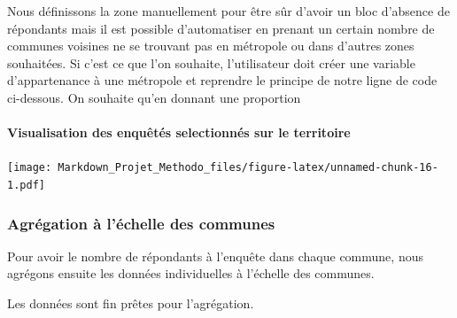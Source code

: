 \documentclass[
]{article}
\newenvironment{Shaded}{\begin{snugshade}}{\end{snugshade}}
\newcommand{\CommentTok}[1]{\textcolor[rgb]{0.56,0.35,0.01}{\textit{#1}}}
\newcommand{\DecValTok}[1]{\textcolor[rgb]{0.00,0.00,0.81}{#1}}
\newcommand{\FunctionTok}[1]{\textcolor[rgb]{0.00,0.00,0.00}{#1}}
\newcommand{\NormalTok}[1]{#1}
\newcommand{\OtherTok}[1]{\textcolor[rgb]{0.56,0.35,0.01}{#1}}
\newcommand{\SpecialCharTok}[1]{\textcolor[rgb]{0.00,0.00,0.00}{#1}}
\begin{document}
Nous définissons la zone manuellement pour être sûr d'avoir un bloc
d'absence de répondants mais il est possible d'automatiser en prenant un
certain nombre de communes voisines ne se trouvant pas en métropole ou
dans d'autres zones souhaitées. Si c'est ce que l'on souhaite,
l'utilisateur doit créer une variable d'appartenance à une métropole et
reprendre le principe de notre ligne de code ci-dessous. On souhaite
qu'en donnant une proportion

\begin{Shaded}
\end{Shaded}

\hypertarget{visualisation-des-enquuxeatuxe9s-selectionnuxe9s-sur-le-territoire}{%
\paragraph{Visualisation des enquêtés selectionnés sur le
territoire}\label{visualisation-des-enquuxeatuxe9s-selectionnuxe9s-sur-le-territoire}}

\texttt{[image: Markdown\_Projet\_Methodo\_files/figure-latex/unnamed-chunk-16-1.pdf]}

\hypertarget{agruxe9gation-uxe0-luxe9chelle-des-communes}{%
\subsubsection{Agrégation à l'échelle des
communes}\label{agruxe9gation-uxe0-luxe9chelle-des-communes}}

Pour avoir le nombre de répondants à l'enquête dans chaque commune, nous
agrégons ensuite les données individuelles à l'échelle des communes.

Les données sont fin prêtes pour l'agrégation.
\end{document}
